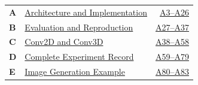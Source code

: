\renewcommand{\arraystretch}{1.65}
\begin{tabular}{@{}p{0.65cm}p{10.5cm}r@{}}
\textbf{A} & \hyperlink{appendix-architecture}{Architecture and Implementation} & \hyperlink{appendix-architecture}{A3--A26} \\
\textbf{B} & \hyperlink{appendix-evaluation}{Evaluation and Reproduction} & \hyperlink{appendix-evaluation}{A27--A37} \\
\textbf{C} & \hyperlink{appendix-convolutions}{Conv2D and Conv3D} & \hyperlink{appendix-convolutions}{A38--A58} \\
\textbf{D} & \hyperlink{appendix-experiments}{Complete Experiment Record} & \hyperlink{appendix-experiments}{A59--A79} \\
\textbf{E} & \hyperlink{appendix-image-generation}{Image Generation Example} & \hyperlink{appendix-image-generation}{A80--A83} \\
\end{tabular}
